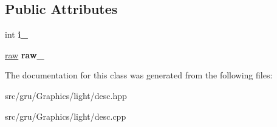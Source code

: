\subsection*{\-Public \-Attributes}
\begin{DoxyCompactItemize}
\item 
\hypertarget{classglutpp_1_1light_1_1desc_aa7e6b6c520eae85c7393daeb663d7a14}{int {\bfseries i\-\_\-}}\label{classglutpp_1_1light_1_1desc_aa7e6b6c520eae85c7393daeb663d7a14}

\item 
\hypertarget{classglutpp_1_1light_1_1desc_a593475e0ddb2755783b0d666196f4a74}{\hyperlink{classglutpp_1_1light_1_1raw}{raw} {\bfseries raw\-\_\-}}\label{classglutpp_1_1light_1_1desc_a593475e0ddb2755783b0d666196f4a74}

\end{DoxyCompactItemize}


\-The documentation for this class was generated from the following files\-:\begin{DoxyCompactItemize}
\item 
src/gru/\-Graphics/light/desc.\-hpp\item 
src/gru/\-Graphics/light/desc.\-cpp\end{DoxyCompactItemize}
